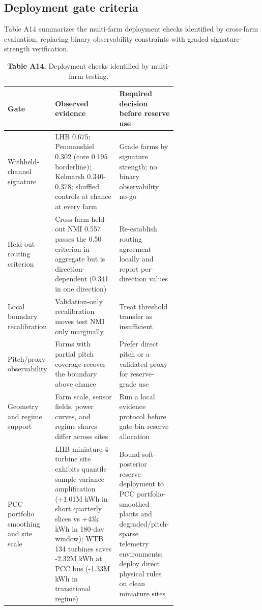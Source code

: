 \documentclass[
  journal]{IEEEtran}
\begin{document}
\FloatBarrier

\subsection*{Deployment gate criteria}\label{deployment-gate-criteria}

Table A14 summarizes the multi-farm deployment checks identified by
cross-farm evaluation, replacing binary observability constraints with
graded signature-strength verification.

\begin{table}[!t]
\centering
\fontsize{8.0pt}{9.6pt}\selectfont
\setlength{\tabcolsep}{2.0pt}
\renewcommand{\arraystretch}{1.05}
\caption*{\textbf{Table A14.} Deployment checks identified by multi-farm testing.}
%
\begin{tabularx}{\linewidth}{>{\raggedright\arraybackslash}p{0.28\linewidth} >{\raggedright\arraybackslash}p{0.38\linewidth} >{\raggedright\arraybackslash}X}
\toprule
Gate & Observed evidence & Required decision before reserve use \\
\midrule
Withheld-channel signature & LHB 0.675; Penmanshiel 0.302 (core 0.195 borderline); Kelmarsh 0.340-0.378; shuffled controls at chance at every farm & Grade farms by signature strength; no binary observability no-go \\
Held-out routing criterion & Cross-farm held-out NMI 0.557 passes the 0.50 criterion in aggregate but is direction-dependent (0.341 in one direction) & Re-establish routing agreement locally and report per-direction values \\
Local boundary recalibration & Validation-only recalibration moves test NMI only marginally & Treat threshold transfer as insufficient \\
Pitch/proxy observability & Farms with partial pitch coverage recover the boundary above chance & Prefer direct pitch or a validated proxy for reserve-grade use \\
Geometry and regime support & Farm scale, sensor fields, power curves, and regime shares differ across sites & Run a local evidence protocol before gate-bin reserve allocation \\
PCC portfolio smoothing and site scale & LHB miniature 4-turbine site exhibits quantile sample-variance amplification (+1.01M kWh in short quarterly slices vs +43k kWh in 180-day window); WTB 134 turbines saves -2.32M kWh at PCC bus (-1.33M kWh in transitional regime) & Bound soft-posterior reserve deployment to PCC portfolio-smoothed plants and degraded/pitch-sparse telemetry environments; deploy direct physical rules on clean miniature sites \\
\bottomrule
\end{tabularx}
\end{table}
\end{document}
